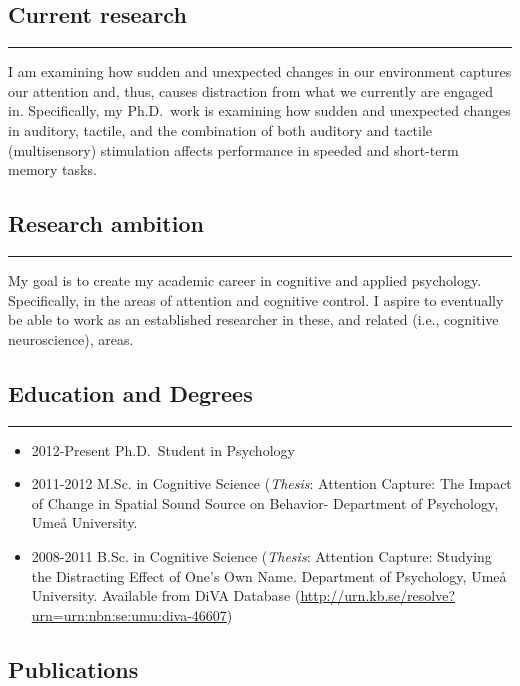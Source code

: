 \documentclass[]{article}
\begin{document}
\subsection{Current research}\label{current-research}

\hrule

I am examining how sudden and unexpected changes in our environment
captures our attention and, thus, causes distraction from what we
currently are engaged in. Specifically, my Ph.D.~work is examining how
sudden and unexpected changes in auditory, tactile, and the combination
of both auditory and tactile (multisensory) stimulation affects
performance in speeded and short-term memory tasks.

\subsection{Research ambition}\label{research-ambition}

\hrule

My goal is to create my academic career in cognitive and applied
psychology. Specifically, in the areas of attention and cognitive
control. I aspire to eventually be able to work as an established
researcher in these, and related (i.e., cognitive neuroscience), areas.

\subsection{Education and Degrees}\label{education-and-degrees}

\hrule

\begin{itemize}
\item
  2012-Present Ph.D.~Student in Psychology
\item
  2011-2012 M.Sc. in Cognitive Science (\emph{Thesis}: Attention
  Capture: The Impact of Change in Spatial Sound Source on Behavior-
  Department of Psychology, Umeå University.
\item
  2008-2011 B.Sc. in Cognitive Science (\emph{Thesis}: Attention
  Capture: Studying the Distracting Effect of One's Own Name. Department
  of Psychology, Umeå University. Available from DiVA Database
  (\url{http://urn.kb.se/resolve?urn=urn:nbn:se:umu:diva-46607})
\end{itemize}

\subsection{Publications}\label{publications}
\end{document}
